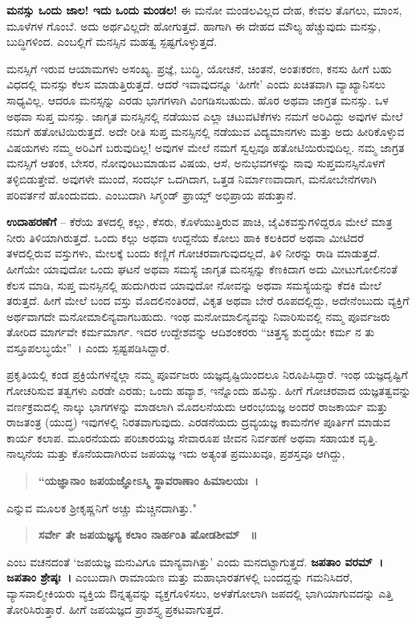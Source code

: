 {\textbf{ಮನಸ್ಸು ಒಂದು ಜಾಲ! ಇದು ಒಂದು ಮಂಡಲ!} ಈ ಮನೋ ಮಂಡಲವಿಲ್ಲದ ದೇಹ, ಕೇವಲ ತೊಗಲು, ಮಾಂಸ, ಮೂಳೆಗಳ ಗೊಂಬೆ. ಅದು ಅರ್ಥವಿಲ್ಲದೇ ಹೋಗುತ್ತದೆ. ಹಾಗಾಗಿ ಈ ದೇಹದ ಮೌಲ್ಯ ಹೆಚ್ಚುವುದು ಮನಸ್ಸು, ಬುದ್ಧಿಗಳಿಂದ. ಎಂಬಲ್ಲಿಗೆ ಮನಸ್ಸಿನ ಮಹತ್ವ ಸ್ಪಷ್ಟಗೊಳ್ಳುತ್ತದೆ.

ಮನಸ್ಸಿಗೆ ಇರುವ ಆಯಾಮಗಳು ಅಸಂಖ್ಯ. ಪ್ರಜ್ಞೆ, ಬುದ್ಧಿ, ಯೋಚನೆ, ಚಿಂತನೆ, ಅಂತಃಕರಣ, ಕನಸು ಹೀಗೆ ಬಹು ವಿಧದಲ್ಲಿ ಮನಸ್ಸು ಕೆಲಸ ಮಾಡುತ್ತಿರುತ್ತದೆ. ಆದರೆ ಇವಾವುದನ್ನೂ ‘ಹೀಗೇ’ ಎಂದು ಖಚಿತವಾಗಿ ವ್ಯಾಖ್ಯಾನಿಸಲು ಸಾಧ್ಯವಿಲ್ಲ. ಆದರೂ ಮನಸ್ಸನ್ನು ಎರಡು ಭಾಗಗಳಾಗಿ ವಿಂಗಡಿಸಬಹುದು. ಹೊರ ಅಥವಾ ಜಾಗ್ರತ ಮನಸ್ಸು. ಒಳ ಅಥವಾ ಸುಪ್ತ ಮನಸ್ಸು. ಜಾಗೃತ ಮನಸ್ಸಿನಲ್ಲಿ ನಡೆಯುವ ಎಲ್ಲಾ ಚಟುವಟಿಕೆಗಳು ನಮಗೆ ಅರಿವಿದ್ದು ಅವುಗಳ ಮೇಲೆ ನಮಗೆ ಹತೋಟಿಯಿರುತ್ತದೆ. ಅದೇ ರೀತಿ ಸುಪ್ತ ಮನಸ್ಸಿನಲ್ಲಿ ನಡೆಯುವ ವಿದ್ಯಮಾನಗಳು ಮತ್ತು ಅದು ಹೀರಿಕೊಳ್ಳುವ ವಿಷಯಗಳು ನಮ್ಮ ಅರಿವಿಗೆ ಬರುವುದಿಲ್ಲ! ಅವುಗಳ ಮೇಲೆ ನಮಗೆ ಸ್ವಲ್ಪವೂ ಹತೋಟಿಯಿರುವುದಿಲ್ಲ. ನಮ್ಮ ಜಾಗ್ರತ ಮನಸ್ಸಿಗೆ ಆತಂಕ, ಬೇಸರ, ನೋವುಂಟುಮಾಡುವ ವಿಷಯ, ಆಸೆ, ಅನುಭವಗಳನ್ನು ನಾವು ಸುಪ್ತಮನಸ್ಸಿನೊಳಗೆ ತಳ್ಳಿಬಿಡುತ್ತೇವೆ. ಅವುಗಳೇ ಮುಂದೆ, ಸಂದರ್ಭ ಒದಗಿದಾಗ, ಒತ್ತಡ ನಿರ್ಮಾಣವಾದಾಗ, ಮನೋಬೇನೆಗಳಾಗಿ ಪರಿವರ್ತನೆ ಹೊಂದುವದು. ಎಂಬುದಾಗಿ ಸಿಗ್ಮಂಡ್‌ ಫ್ರಾಯ್ಡ್ ಅಭಿಪ್ರಾಯ ಪಡುತ್ತಾನೆ.

\textbf{ಉದಾಹರಣೆಗೆ} – ಕೆರೆಯ ತಳದಲ್ಲಿ ಕಲ್ಲು, ಕೆಸರು, ಕೊಳೆಯುತ್ತಿರುವ ಪಾಚಿ, ಜೈವಿಕ\-ವಸ್ತುಗಳಿದ್ದರೂ ಮೇಲೆ ಮಾತ್ರ ನೀರು ತಿಳಿಯಾಗಿರುತ್ತದೆ. ಒಂದು ಕಲ್ಲು ಅಥವಾ ಉದ್ದನೆಯ ಕೋಲು ಹಾಕಿ ಕಲಕಿದರೆ ಅಥವಾ ಮೀಟಿದರೆ ತಳದಲ್ಲಿರುವ ವಸ್ತುಗಳು, ಮೇಲಕ್ಕೆ ಬಂದು ಕಣ್ಣಿಗೆ ಗೋಚರವಾಗುವುದಲ್ಲದೆ, ತಿಳಿ ನೀರನ್ನು ರಾಡಿ ಮಾಡುತ್ತದೆ. ಹೀಗೆಯೇ ಯಾವುದೋ ಒಂದು ಘಟನೆ ಅಥವಾ ಸಮಸ್ಯೆ ಜಾಗೃತ ಮನಸ್ಸನ್ನು ಕೆಣಕಿ\-ದಾಗ ಅದು ಮೀಟುಗೋಲಿನಂತೆ ಕೆಲಸ ಮಾಡಿ, ಸುಪ್ತ ಮನಸ್ಸಿನಲ್ಲಿ ಹುದುಗಿರುವ ಯಾವುದೋ ನೋವನ್ನು ಅಥವಾ ಸಮಸ್ಯೆಯನ್ನು ಕೆದಕಿ ಮೇಲೆ ತರುತ್ತದೆ. ಹೀಗೆ ಮೇಲೆ ಬಂದ ವಸ್ತು ಮೊದಲಿನಂತಿರದೆ, ವಿಕೃತ ಅಥವಾ ಬೇರೆ ರೂಪದಲ್ಲಿದ್ದು, ಅದೇ\-ನೆಂಬುದು ವ್ಯಕ್ತಿಗೆ ಅರ್ಥವಾಗದೇ ಮನೋಮಾಲಿನ್ಯವಾಗಬಹುದು. ಇಂಥ ಮನೋಮಾಲಿನ್ಯವನ್ನು ನಿವಾರಿಸುವಲ್ಲಿ ನಮ್ಮ ಪೂರ್ವಜರು ತೋರಿದ ಮಾರ್ಗವೇ ಕರ್ಮಮಾರ್ಗ. ಇದರ ಉದ್ದೇಶವನ್ನು ಆದಿಶಂಕರರು “ಚಿತ್ತಸ್ಯ ಶುದ್ಧಯೇ ಕರ್ಮ ನ ತು ವಸ್ತೂಪಲಬ್ಧಯೇ”~। ಎಂದು ಸ್ಪಷ್ಟಪಡಿಸಿದ್ದಾರೆ.

ಪ್ರಕೃತಿಯಲ್ಲಿ ಕಂಡ ಪ್ರಕ್ರಿಯೆಗಳನ್ನೆಲ್ಲಾ ನಮ್ಮ ಪೂರ್ವಜರು ಯಜ್ಞದೃಷ್ಟಿ\-ಯಿಂದಲೂ ನಿರೂಪಿಸಿದ್ದಾರೆ. ಇಂಥ ಯಜ್ಞದೃಷ್ಟಿಗೆ ಗೋಚರಿಸುವ ತತ್ವಗಳು ಎರಡೇ ಎರಡು; ಒಂದು ಹವ್ಯಾಶ, ಇನ್ನೊಂದು ಹವಿಸ್ಸು. ಹೀಗೆ ಗೋಚರವಾದ ಯಜ್ಞತತ್ವವನ್ನು ವರ್ಣಕ್ರಮದಲ್ಲಿ ನಾಲ್ಕು ಭಾಗಗಳನ್ನು ಮಾಡಲಾಗಿ \enginline{-} ಮೊದಲನೆಯದು ಆರಂಭಯಜ್ಞ \enginline{-} ಅಂದರೆ ರಾಜಕಾರ್ಯ ಮತ್ತು ರಾಜತಂತ್ರ (ಯುದ್ಧ) ಇವುಗಳಲ್ಲಿ ನಿರತವಾಗುವುದು. ಎರಡನೆಯದು ದ್ರವ್ಯಯಜ್ಞ \enginline{-} ಕಾಮನೆಗಳ ಪೂರ್ತಿಗೆ ಮಾಡುವ ಕಾರ್ಯ ಕಲಾಪ. ಮೂರನೆಯದು ಪರಿಚಾರಯಜ್ಞ \enginline{-} ಸೇವಾರೂಪ ಜೀವನ ನಿರ್ವಹಣೆ ಅಥವಾ ಸಹಾಯಕ ವೃತ್ತಿ. ನಾಲ್ಕನೆಯ ಮತ್ತು ಕೊನೆಯದಾಗಿರುವ ಜಪಯಜ್ಞ \enginline{-} ಇದು ಅತ್ಯಂತ ಪ್ರಮುಖವೂ, ಪ್ರಶಸ್ತವೂ ಆಗಿದ್ದು, 
\begin{verse}
\textbf{“ಯಜ್ಞಾನಾಂ ಜಪಯಜ್ಞೋಽಸ್ಮಿ ಸ್ಥಾವರಾಣಾಂ ಹಿಮಾಲಯಃ~। }
\end{verse}
ಎನ್ನುವ ಮೂಲಕ ಶ್ರೀಕೃಷ್ಣನಿಗೆ ಅಚ್ಚು ಮೆಚ್ಚಿನದಾಗಿತ್ತು." 
\begin{verse}
\textbf{ಸರ್ವೇ ತೇ ಜಪಯಜ್ಞಸ್ಯ ಕಲಾಂ ನಾರ್ಹಂತಿ ಷೋಡಶೀಮ್ ~॥}
\end{verse}
ಎಂಬ ವಚನದಂತೆ ‘ಜಪಯಜ್ಞ ಮನುವಿಗೂ ಮಾನ್ಯವಾಗಿತ್ತು’ ಎಂದು ಮನದಟ್ಟಾ\-ಗುತ್ತದೆ. \textbf{ಜಪತಾಂ ವರಮ್~। ಜಪತಾಂ ಶ್ರೇಷ್ಠಃ~। } ಎಂಬುದಾಗಿ ರಾಮಾಯಣ ಮತ್ತು ಮಹಾಭಾರತಗಳಲ್ಲಿ ಬಂದದ್ದನ್ನು ಗಮನಿಸಿದರೆ, ವ್ಯಾಸವಾಲ್ಮೀಕಿಯರು ವ್ಯಕ್ತಿಯ ಔನ್ನತ್ಯ\-ವನ್ನು ವ್ಯಕ್ತಗೊಳಿಸಲು, ಅಳತೆಗೋಲಾಗಿ ಜಪದಲ್ಲಿ ಭಾಗಿಯಾಗುವದನ್ನು ಎತ್ತಿ ತೋರಿಸಿರುತ್ತಾರೆ. ಹೀಗೆ ಜಪಯಜ್ಞದ ಪ್ರಾಶಸ್ತ್ಯ ಪ್ರಕಟವಾಗುತ್ತದೆ.

}
